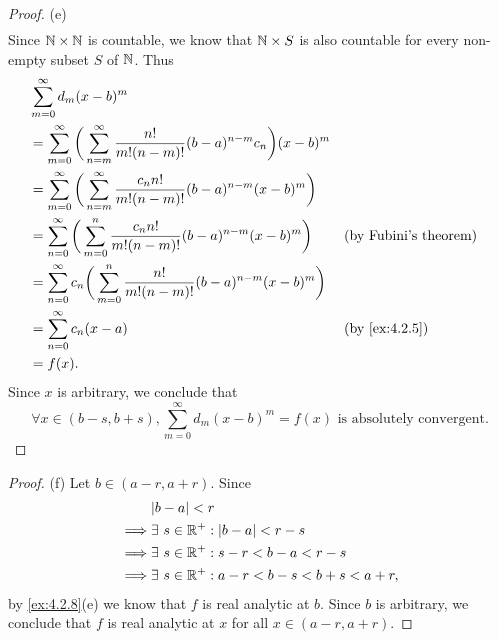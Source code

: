 \begin{proof}{(e)}
\begin{align*}
  \end{align*}
  Since \(\mathbb{N} \times \mathbb{N}\) is countable, we know that \(\mathbb{N} \times S\) is also countable for every non-empty subset \(S\) of \(\mathbb{N}\).
  Thus
  \begin{align*}
     & \sum_{m = 0}^\infty d_m (x - b)^m                                                                                                             \\
     & = \sum_{m = 0}^\infty \bigg(\sum_{n = m}^\infty \dfrac{n!}{m! (n - m)!} (b - a)^{n - m} c_n\bigg) (x - b)^m                                   \\
     & = \sum_{m = 0}^\infty \bigg(\sum_{n = m}^\infty \dfrac{c_n n!}{m! (n - m)!} (b - a)^{n - m} (x - b)^m\bigg)                                   \\
     & = \sum_{n = 0}^\infty \bigg(\sum_{m = 0}^n \dfrac{c_n n!}{m! (n - m)!} (b - a)^{n - m} (x - b)^m\bigg)      &  & \text{(by Fubini's theorem)} \\
     & = \sum_{n = 0}^\infty c_n \bigg(\sum_{m = 0}^n \dfrac{n!}{m! (n - m)!} (b - a)^{n - m} (x - b)^m\bigg)                                        \\
     & = \sum_{n = 0}^\infty c_n (x - a)                                                                           &  & \text{(by \cref{ex:4.2.5})}  \\
     & = f(x).
  \end{align*}
  Since \(x\) is arbitrary, we conclude that
  \[
    \forall x \in (b - s, b + s), \sum_{m = 0}^\infty d_m (x - b)^m = f(x) \text{ is absolutely convergent}.
  \]
\end{proof}

\begin{proof}{(f)}
  Let \(b \in (a - r, a + r)\).
  Since
  \begin{align*}
             & \abs{b - a} < r                                      \\
    \implies & \exists\ s \in \R^+ : \abs{b - a} < r - s            \\
    \implies & \exists\ s \in \R^+ : s - r < b - a < r - s          \\
    \implies & \exists\ s \in \R^+ : a - r < b - s < b + s < a + r,
  \end{align*}
  by \cref{ex:4.2.8}(e) we know that \(f\) is real analytic at \(b\).
  Since \(b\) is arbitrary, we conclude that \(f\) is real analytic at \(x\) for all \(x \in (a - r, a + r)\).
\end{proof}